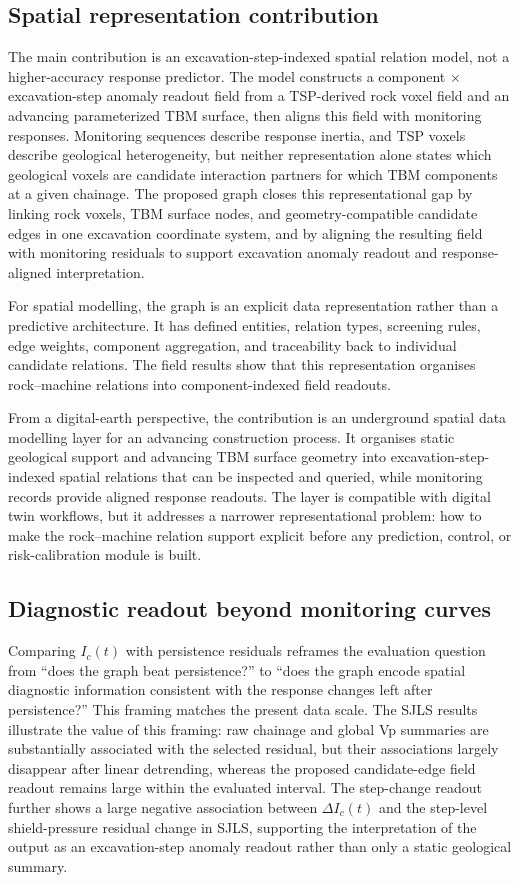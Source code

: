 \subsection{Spatial representation contribution}
\label{sec:graph_necessity}
The main contribution is an excavation-step-indexed spatial relation model,
not a higher-accuracy response predictor. The model constructs a component
$\times$ excavation-step anomaly readout field from a TSP-derived rock
voxel field and an advancing parameterized TBM surface, then aligns this field
with monitoring responses. Monitoring sequences describe response inertia, and
TSP voxels describe geological heterogeneity, but neither representation alone states
which geological voxels are candidate interaction partners for which TBM
components at a given chainage. The proposed graph closes this representational
gap by linking rock voxels, TBM surface nodes, and geometry-compatible
candidate edges in one excavation coordinate system, and by aligning the
resulting field with monitoring residuals to support excavation anomaly
readout and response-aligned interpretation.

For spatial modelling, the graph is an explicit data representation rather
than a predictive architecture. It has defined entities, relation types,
screening rules, edge weights, component aggregation, and traceability back to
individual candidate relations. The field results show that this representation
organises rock--machine relations into component-indexed field readouts.

From a digital-earth perspective, the contribution is an underground spatial
data modelling layer for an advancing construction process. It organises static
geological support and advancing TBM surface geometry into
excavation-step-indexed spatial relations that can be inspected and queried,
while monitoring records provide aligned response readouts. The layer is
compatible with digital twin workflows, but it addresses a narrower
representational problem: how to make the rock--machine relation support
explicit before any prediction, control, or risk-calibration module is built.

\subsection{Diagnostic readout beyond monitoring curves}
\label{sec:descriptor_value}
Comparing $I_c(t)$ with persistence residuals reframes the evaluation question
from ``does the graph beat persistence?'' to ``does the graph encode spatial
diagnostic information consistent with the response changes left after
persistence?'' This framing matches the present data scale.
The SJLS results illustrate the value of this framing: raw chainage and global
Vp summaries are substantially associated with the selected residual, but their
associations largely disappear after linear detrending, whereas the proposed
candidate-edge field readout remains large within the evaluated interval.
The step-change readout further shows a large negative association between
$\Delta I_c(t)$ and the step-level shield-pressure residual change in SJLS,
supporting the interpretation of the output as an excavation-step anomaly
readout rather than only a static geological summary.

